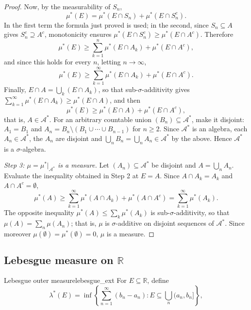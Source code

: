 \documentclass[11pt, a4paper]{article}
\begin{document}
\begin{proof}
Now, by the measurability of $S_n$,
$$ \mu^*(E) = \mu^*(E \cap S_n) + \mu^*(E \cap S_n^c). $$
In the first term the formula just proved is used; in the second, since $S_n \subseteq A$ gives $S_n^c \supseteq A^c$, monotonicity ensures $\mu^*(E \cap S_n^c) \ge \mu^*(E \cap A^c)$. Therefore
$$ \mu^*(E) \ge \sum_{k=1}^n \mu^*(E \cap A_k) + \mu^*(E \cap A^c), $$
and since this holds for every $n$, letting $n \to \infty$,
$$ \mu^*(E) \ge \sum_{k=1}^\infty \mu^*(E \cap A_k) + \mu^*(E \cap A^c). $$
Finally, $E \cap A = \bigcup_k (E \cap A_k)$, so that sub-$\sigma$-additivity gives $\sum_{k=1}^\infty \mu^*(E \cap A_k) \ge \mu^*(E \cap A)$, and then
$$ \mu^*(E) \ge \mu^*(E \cap A) + \mu^*(E \cap A^c), $$
that is, $A \in \mathcal{A}^*$. For an arbitrary countable union $(B_n) \subseteq \mathcal{A}^*$, make it disjoint: $A_1 = B_1$ and $A_n = B_n \setminus (B_1 \cup \cdots \cup B_{n-1})$ for $n \ge 2$. Since $\mathcal{A}^*$ is an algebra, each $A_n \in \mathcal{A}^*$, the $A_n$ are disjoint and $\bigcup_n B_n = \bigcup_n A_n \in \mathcal{A}^*$ by the above. Hence $\mathcal{A}^*$ is a $\sigma$-algebra.

\textit{Step 3: $\mu = \mu^*|_{\mathcal{A}^*}$ is a measure.} Let $(A_n) \subseteq \mathcal{A}^*$ be disjoint and $A = \bigcup_n A_n$. Evaluate the inequality obtained in Step 2 at $E = A$. Since $A \cap A_k = A_k$ and $A \cap A^c = \emptyset$,
$$ \mu^*(A) \ge \sum_{k=1}^\infty \mu^*(A \cap A_k) + \mu^*(A \cap A^c) = \sum_{k=1}^\infty \mu^*(A_k). $$
The opposite inequality $\mu^*(A) \le \sum_k \mu^*(A_k)$ is sub-$\sigma$-additivity, so that $\mu(A) = \sum_n \mu(A_n)$; that is, $\mu$ is $\sigma$-additive on disjoint sequences of $\mathcal{A}^*$. Since moreover $\mu(\emptyset) = \mu^*(\emptyset) = 0$, $\mu$ is a measure.
\end{proof}

\subsection{Lebesgue measure on \texorpdfstring{$\mathbb{R}$}{R}}

\begin{definicion}{Lebesgue outer measure}{lebesgue_ext}
For $E \subseteq \mathbb{R}$, define
$$ \lambda^*(E) = \inf\!\left\{ \sum_{n=1}^\infty (b_n - a_n) : E \subseteq \bigcup_n (a_n, b_n]
\right\}, $$
\end{definicion}
\end{document}
